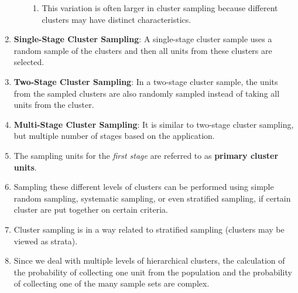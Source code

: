 \begin{enumerate}[itemsep=0.2cm]
\begin{enumerate}[itemsep=0.1cm]
\begin{enumerate}
            \item This variation is often larger in cluster sampling because different clusters may have distinct characteristics.
            \hfill \cite{common/online/chatgpt}

        \end{enumerate}
        
    \end{enumerate}

    \item \textbf{Single-Stage Cluster Sampling}\label{Sampling Plans/Representative Sampling/Cluster Sampling/Single-Stage Cluster Sampling}: A single-stage cluster sample uses a random sample of the clusters and then all units from these clusters are selected. 
    \hfill \cite{statistics/book/Statistics-for-Data-Scientists/Maurits-Kaptein}

    \item \textbf{Two-Stage Cluster Sampling}\label{Sampling Plans/Representative Sampling/Cluster Sampling/Two-Stage Cluster Sampling}: In a two-stage cluster sample, the units from the sampled clusters are also randomly sampled instead of taking all units from the cluster.
    \hfill \cite{statistics/book/Statistics-for-Data-Scientists/Maurits-Kaptein}

    \item \textbf{Multi-Stage Cluster Sampling}\label{Sampling Plans/Representative Sampling/Cluster Sampling/Multi-Stage Cluster Sampling}: It is similar to two-stage cluster sampling, but multiple number of stages based on the application.
    \hfill \cite{statistics/book/Statistics-for-Data-Scientists/Maurits-Kaptein}

    \item The sampling units for the \textit{first stage} are referred to as \textbf{primary cluster units}\label{Sampling Plans/Representative Sampling/Cluster Sampling/primary cluster units}.
    \hfill \cite{statistics/book/Statistics-for-Data-Scientists/Maurits-Kaptein}

    \item Sampling these different levels of clusters can be performed using simple random sampling, systematic sampling, or even stratified sampling, if certain cluster are put together on certain criteria.
    \hfill \cite{statistics/book/Statistics-for-Data-Scientists/Maurits-Kaptein}

    \item Cluster sampling is in a way related to stratified sampling (clusters may be viewed as strata).
    \hfill \cite{statistics/book/Statistics-for-Data-Scientists/Maurits-Kaptein}

    \item Since we deal with multiple levels of hierarchical clusters, the calculation of the probability of collecting one unit from the population and the probability of collecting one of the many sample sets are complex.
    \hfill \cite{statistics/book/Statistics-for-Data-Scientists/Maurits-Kaptein}
\end{enumerate}
